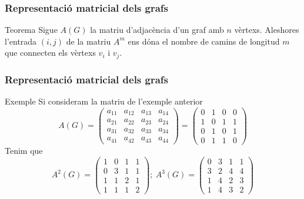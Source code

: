 \documentclass{beamer}
\begin{document}
\begin{frame}
\frametitle{Representació matricial dels grafs}
\begin{block}{Teorema}
Sigue $A(G)$ la matriu d'adjacència d'un graf amb $n$ vèrtexs. Aleshores l'entrada $(i,j)$ de la matriu $A^m$ ens dóna el nombre de camins de longitud $m$ que connecten els vèrtexs $v_i$ i $v_j$.  
\end{block}
\end{frame}




\begin{frame}
\frametitle{Representació matricial dels grafs}
\begin{block}{Exemple}
Si consideram la matriu de l'exemple anterior
\[A(G) = \left(\begin{array}{cccc}a_{11} & a_{12} & a_{13} & a_{14} \\a_{21} & a_{22} & a_{23} & a_{24} \\a_{31} & a_{32} & a_{33} & a_{34} \\a_{41} & a_{42} & a_{43} & a_{44}\end{array}\right) = \left(\begin{array}{cccc}0 & 1 & 0 & 0 \\1 & 0 & 1 & 1 \\0 & 1 & 0 & 1 \\0 & 1 & 1 & 0\end{array}\right)\]
Tenim que
\[A^2(G) = \left(\begin{array}{cccc}1 & 0 & 1 & 1 \\0 & 3 & 1 & 1 \\1 & 1 & 2 & 1 \\1 & 1 & 1 & 2\end{array}\right); \ A^3(G) = \left(\begin{array}{cccc}0 & 3 & 1 & 1 \\3 & 2 & 4 & 4 \\1 & 4 & 2 & 3 \\1 & 4 & 3 & 2\end{array}\right)\]

\end{block}
\end{frame}
\end{document}
